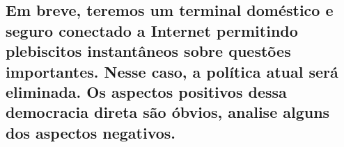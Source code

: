 \subsection{Em breve, teremos um terminal doméstico e seguro conectado a
Internet permitindo plebiscitos instantâneos sobre questões
importantes. Nesse caso, a política atual será eliminada. Os
aspectos positivos dessa democracia direta são óbvios, analise
alguns dos aspectos negativos.}

